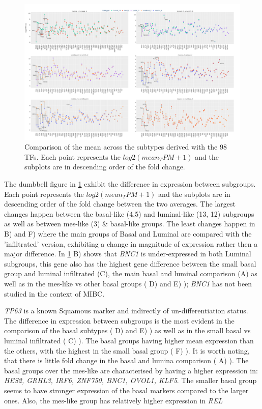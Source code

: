 \begin{figure}[!htb]   
\centering
\includegraphics[width=1.0\textwidth,height=1.0\textheight,keepaspectratio]{Sections/Network_I/Resources/selective_pruning/dumbell_sel_tfs.png}
  \caption{Comparison of the mean across the subtypes derived with the 98 TFs. Each point represents the $log2(mean_TPM+1)$ and the subplots are in descending order of the fold change.}
\label{fig:N_I:dumbell_sel_tfs}
\end{figure}


The dumbbell figure in \cref{fig:N_I:dumbell_sel_tfs} exhibit the difference in expression between subgroups. Each point represents the $log2(mean_TPM+1)$ and the subplots are in descending order of the fold change between the two averages. The largest changes happen between the basal-like (4,5) and luminal-like (13, 12) subgroups as well as between mes-like (3) \& basal-like groups. The least changes happen in B) and F) where the main groups of Basal and Luminal are compared with the 'infiltrated' version, exhibiting a change in magnitude of expression rather then a major difference. In \cref{fig:N_I:dumbell_sel_tfs} B) shows that \textit{BNC1} is under-expressed in both Luminal subgroups, this gene also has the highest gene difference between the small basal group and luminal infiltrated (C), the main basal and luminal comparison (A) as well as in the mes-like vs other basal groups ( D) and E) ); \textit{BNC1} has not been studied in the context of MIBC. 

\textit{TP63} is a known Squamous marker \citet{Robertson2023-na} and indirectly of un-differentiation status. The difference in expression between subgroups is the most evident in the comparison of the basal subtypes ( D) and E) ) as well as in the small basal vs luminal infiltrated ( C) ). The basal groups having higher mean expression than the others, with the highest in the small basal group ( F) ). It is worth noting, that there is little fold change in the basal and lumina comparison ( A) ). The basal groups over the mes-like are characterised by having a higher expression in: \textit{HES2, GRHL3, IRF6, ZNF750, BNC1, OVOL1, KLF5}. The smaller basal group seems to have stronger expression of the basal markers compared to the larger ones. Also, the mes-like group has relatively higher expression in \textit{REL}

